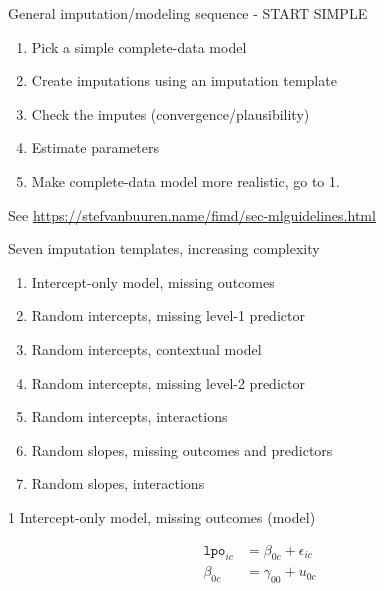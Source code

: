\documentclass[ignorenonframetext,aspectratio=43]{beamer}
\providecommand{\tightlist}{%
  \setlength{\itemsep}{0pt}\setlength{\parskip}{0pt}}
\begin{document}
\begin{frame}{General imputation/modeling sequence - START SIMPLE}

\begin{enumerate}
\def\labelenumi{\arabic{enumi}.}
\tightlist
\item
  Pick a simple complete-data model
\item
  Create imputations using an imputation template
\item
  Check the imputes (convergence/plausibility)
\item
  Estimate parameters
\item
  Make complete-data model more realistic, go to 1.
\end{enumerate}

See \url{https://stefvanbuuren.name/fimd/sec-mlguidelines.html}

\end{frame}

\begin{frame}{Seven imputation templates, increasing complexity}

\begin{enumerate}
\def\labelenumi{\arabic{enumi}.}
\tightlist
\item
  Intercept-only model, missing outcomes
\item
  Random intercepts, missing level-1 predictor
\item
  Random intercepts, contextual model
\item
  Random intercepts, missing level-2 predictor
\item
  Random intercepts, interactions
\item
  Random slopes, missing outcomes and predictors
\item
  Random slopes, interactions
\end{enumerate}

\end{frame}

\begin{frame}{1 Intercept-only model, missing outcomes (model)}

\begin{align}
{{\texttt{lpo}}}_{ic} & = \beta_{0c} + \epsilon_{ic}\\
\beta_{0c}     & = \gamma_{00} + u_{0c}
\end{align}

\end{frame}
\end{document}
